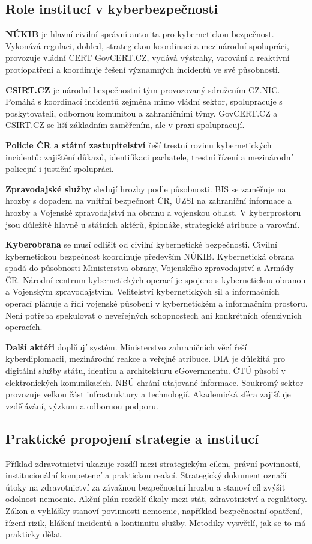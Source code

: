\subsection*{Role institucí v kyberbezpečnosti}
\textbf{NÚKIB} je hlavní civilní správní autorita pro kybernetickou bezpečnost. Vykonává regulaci, dohled, strategickou koordinaci a mezinárodní spolupráci, provozuje vládní CERT GovCERT.CZ, vydává výstrahy, varování a reaktivní protiopatření a koordinuje řešení významných incidentů ve své působnosti.

\textbf{CSIRT.CZ} je národní bezpečnostní tým provozovaný sdružením CZ.NIC. Pomáhá s koordinací incidentů zejména mimo vládní sektor, spolupracuje s poskytovateli, odbornou komunitou a zahraničními týmy. GovCERT.CZ a CSIRT.CZ se liší základním zaměřením, ale v praxi spolupracují.

\textbf{Policie ČR a státní zastupitelství} řeší trestní rovinu kybernetických incidentů: zajištění důkazů, identifikaci pachatele, trestní řízení a mezinárodní policejní i justiční spolupráci.

\textbf{Zpravodajské služby} sledují hrozby podle působnosti. BIS se zaměřuje na hrozby s dopadem na vnitřní bezpečnost ČR, ÚZSI na zahraniční informace a hrozby a Vojenské zpravodajství na obranu a vojenskou oblast. V kyberprostoru jsou důležité hlavně u státních aktérů, špionáže, strategické atribuce a varování.

\textbf{Kyberobrana} se musí odlišit od civilní kybernetické bezpečnosti. Civilní kybernetickou bezpečnost koordinuje především NÚKIB. Kybernetická obrana spadá do působnosti Ministerstva obrany, Vojenského zpravodajství a Armády ČR. Národní centrum kybernetických operací je spojeno s kybernetickou obranou a Vojenským zpravodajstvím. Velitelství kybernetických sil a informačních operací plánuje a řídí vojenské působení v kybernetickém a informačním prostoru. Není potřeba spekulovat o neveřejných schopnostech ani konkrétních ofenzivních operacích.

\textbf{Další aktéři} doplňují systém. Ministerstvo zahraničních věcí řeší kyberdiplomacii, mezinárodní reakce a veřejné atribuce. DIA je důležitá pro digitální služby státu, identitu a architekturu eGovernmentu. ČTÚ působí v elektronických komunikacích. NBÚ chrání utajované informace. Soukromý sektor provozuje velkou část infrastruktury a technologií. Akademická sféra zajišťuje vzdělávání, výzkum a odbornou podporu.

\subsection*{Praktické propojení strategie a institucí}
Příklad zdravotnictví ukazuje rozdíl mezi strategickým cílem, právní povinností, institucionální kompetencí a praktickou reakcí. Strategický dokument označí útoky na zdravotnictví za závažnou bezpečnostní hrozbu a stanoví cíl zvýšit odolnost nemocnic. Akční plán rozdělí úkoly mezi stát, zdravotnictví a regulátory. Zákon a vyhlášky stanoví povinnosti nemocnic, například bezpečnostní opatření, řízení rizik, hlášení incidentů a kontinuitu služby. Metodiky vysvětlí, jak se to má prakticky dělat.

